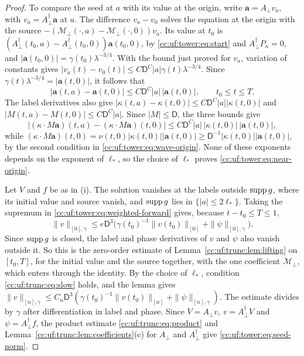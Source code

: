 \begin{proof}
To compare the seed at $a$ with its value at the origin, write
$\mathbf a=A_\perp v_a$, with $v_a=A_\perp^\dagger\mathbf a$ at $a$. The
difference $v_a-v_0$ solves the equation at the origin with the source
$-(\mathcal M_\perp(\cdot,a)-\mathcal M_\perp(\cdot,0))v_a$. Its value at
$t_0$ is $(A_\perp^\dagger(t_0,a)-A_\perp^\dagger(t_0,0))\mathbf a(t_0,0)$,
by \eqref{cc:uf:tower:eq:start} and $A_\perp^\dagger P_\kappa=0$, and
$|\mathbf a(t_0,0)|=\gamma(t_0)\lambda^{-3/4}$. With the bound just
proved for $v_a$, variation of constants gives
$|v_a(t)-v_0(t)|\le C\mathsf D^C|a|\gamma(t)\lambda^{-3/4}$. Since
$\gamma(t)\lambda^{-3/4}=|\mathbf a(t,0)|$, it follows that
\[
 |\mathbf a(t,a)-\mathbf a(t,0)|
 \le C\mathsf D^C|a|\,|\mathbf a(t,0)|,
 \qquad t_0\le t\le T.
\]
The label derivatives also give
$|\kappa(t,a)-\kappa(t,0)|\le C\mathsf D^C|a||\kappa(t,0)|$
and $|M(t,a)-M(t,0)|\le C\mathsf D^C|a|$. Since $|M|\le\mathsf D$, the
three bounds give
\[
 \bigl|(\kappa\cdot M\mathbf a)(t,a)-(\kappa\cdot M\mathbf a)(t,0)\bigr|
 \le C\mathsf D^C|a|\,|\kappa(t,0)|\,|\mathbf a(t,0)| ,
\]
while $(\kappa\cdot M\mathbf a)(t,0)
=\nu(t,0)|\kappa(t,0)||\mathbf a(t,0)|
\ge\mathsf D^{-1}|\kappa(t,0)||\mathbf a(t,0)|$, by the second condition
in \eqref{cc:uf:tower:eq:wave-origin}. None of these exponents depends
on the exponent of $\ell_*$, so the choice of $\ell_*$ proves
\eqref{cc:uf:tower:eq:near-origin}.

Let $V$ and $f$ be as in (i). The solution vanishes at the labels
outside $\operatorname{supp} g$, where its initial value and source vanish, and
$\operatorname{supp} g$ lies in $\{|a|\le2\ell_*\}$. Taking the supremum in
\eqref{cc:uf:tower:eq:weighted-forward} gives, because
$t-t_0\le T\le1$,
\[
 \|v\|_{[0],\gamma}\le e\mathsf D^3\bigl(\gamma(t_0)^{-1}\|v(t_0)\|_{[0]}
       +\|\psi\|_{[0],\gamma}\bigr).
\]
Since $\operatorname{supp} g$ is closed, the label and phase derivatives of $v$ and
$\psi$ also vanish outside it. So this is the zero-order
estimate of Lemma~\ref{cc:uf:trunc:lem:lifting} on $[t_0,T]$, for the
initial value and the source together, with the one coefficient
$\mathcal M_\perp$, which enters through the identity. By the choice of
$\ell_*$, condition \eqref{cc:uf:trunc:eq:slow} holds, and
the lemma gives
$\|v\|_{[n],\gamma}\le C_n\mathsf D^3(\gamma(t_0)^{-1}\|v(t_0)\|_{[n]}
+\|\psi\|_{[n],\gamma})$.
The estimate divides by $\gamma$ after differentiation in label and
phase. Since $V=A_\perp v$, $v=A_\perp^\dagger V$ and
$\psi=A_\perp^\dagger f$, the product estimate
\eqref{cc:uf:trunc:eq:product} and
Lemma~\ref{cc:uf:trunc:lem:coefficients}(c) for $A_\perp$ and
$A_\perp^\dagger$ give \eqref{cc:uf:tower:eq:seed-norm}.


\end{proof}
